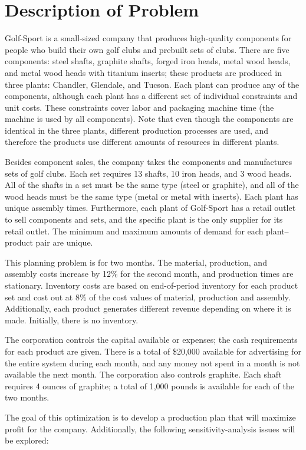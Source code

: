 \documentclass{article}
\begin{document}
\section{Description of Problem}
Golf-Sport is a small-sized company that produces high-quality components for people who build their own golf clubs and prebuilt sets of clubs. There are five components:  steel shafts, graphite shafts, forged iron heads, metal wood heads, and metal wood heads with titanium inserts; these products are produced in three plants:  Chandler, Glendale, and Tucson. Each plant can produce any of the components, although each plant has a different set of individual constraints and unit costs. These constraints cover labor and packaging machine time (the machine is used by all components). Note that even though the components are identical in the three plants, different production processes are used, and therefore the products use different amounts of resources in different plants.
\par
Besides component sales, the company takes the components and manufactures sets of golf clubs. Each set requires 13 shafts, 10 iron heads, and 3 wood heads. All of the shafts in a set must be the same type (steel or graphite), and all of the wood heads must be the same type (metal or metal with inserts). Each plant has unique assembly times.  Furthermore, each plant of Golf-Sport has a retail outlet to sell components and sets, and the specific plant is the only supplier for its retail outlet. The minimum and maximum amounts of demand for each plant–product pair are unique.
\par
This planning problem is for two months. The material, production, and assembly costs increase by 12\% for the second month, and production times are stationary. Inventory costs are based on end-of-period inventory for each product set and cost out at 8\% of the cost values of material, production and assembly. Additionally, each product generates different revenue depending on where it is made. Initially, there is no inventory.
\par
The corporation controls the capital available or expenses; the cash requirements for each product are given. There is a total of \$20,000 available for advertising for the entire system during each month, and any money not spent in a month is not available the next month. The corporation also controls graphite. Each shaft requires 4 ounces of graphite; a total of 1,000 pounds is available for each of the two months. 
\par
The goal of this optimization is to develop a production plan that will maximize profit for the company. Additionally, the following sensitivity-analysis issues will be explored:
\end{document}
